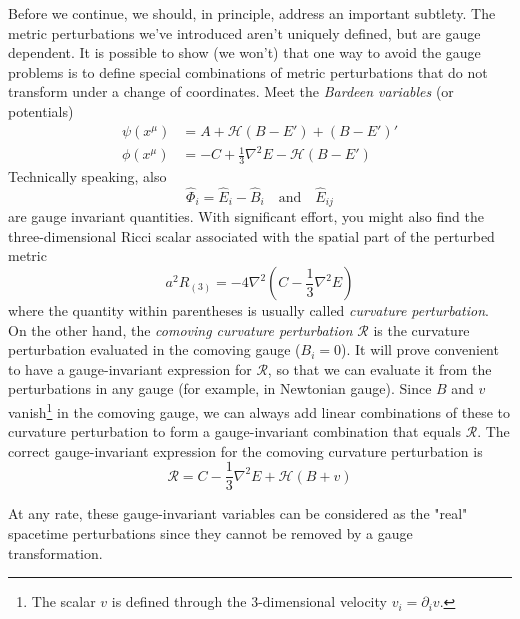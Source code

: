 \par Before we continue, we should, in principle, address an important subtlety. The metric perturbations we've introduced aren’t uniquely defined, but are gauge dependent. It is possible to show (we won't) that one way to avoid the gauge problems is to define special combinations of metric perturbations that do not transform under a change of coordinates. Meet the \emph{Bardeen variables} (or potentials) 
\begin{align}
    \psi(x^{\mu}) &= A + \mathcal{H}(B-E') + (B-E')' \\
    \phi(x^{\mu}) &= -C + \frac{1}{3}\nabla^{2}E -\mathcal{H}(B-E')
    \label{eq:bardeenvariables}
\end{align}
Technically speaking, also
\begin{equation}
    \hat{\Phi}_{i} = \hat{E}_{i} - \hat{B}_{i} \quad \text{and}\quad \hat{E}_{ij}
\end{equation}
are gauge invariant quantities. With significant effort, you might also find the three-dimensional Ricci scalar associated with the spatial part of the perturbed metric
\begin{equation}
    a^{2}R_{(3)} = -4\nabla^{2}\left(C-\frac{1}{3}\nabla^{2}E\right)
\end{equation}
where the quantity within parentheses is usually called \emph{curvature perturbation}. On the other hand, the \emph{comoving curvature perturbation} $\mathcal{R}$ is the curvature perturbation evaluated in the comoving gauge ($B_{i} = 0$). It will prove convenient to have a gauge-invariant expression for $\mathcal{R}$, so that we can evaluate it from the perturbations in any gauge (for example, in Newtonian gauge). Since $B$ and $v$ vanish\footnote{The scalar $v$ is defined through the 3-dimensional velocity $v_{i} = \partial_{i}v$.} in the comoving gauge, we can always add linear combinations of these to curvature perturbation to form a gauge-invariant combination that equals $\mathcal{R}$. The correct gauge-invariant expression for the comoving curvature perturbation is
\begin{equation}
    \mathcal{R} = C-\frac{1}{3}\nabla^{2}E +\mathcal{H}(B+v)
    \label{eq:comovingcurvature}
\end{equation}
\par At any rate, these gauge-invariant variables can be considered as the "real" spacetime perturbations since they cannot be removed by a gauge transformation.
